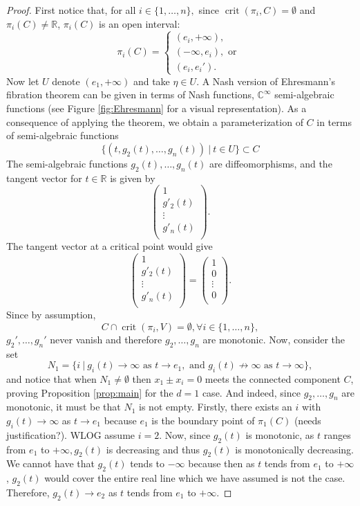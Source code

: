 \documentclass[11pt]{article}
\theoremstyle{definition}
\newcommand{\C}{\mathbb{C}}
\newcommand{\R}{\mathbb{R}}
\DeclareMathOperator{\crit}{crit}
\begin{document}
\begin{proof}
First notice that, for all $i \in \{1,\hdots,n\},$ since $\crit(\pi_i,C) = \emptyset$ and $\pi_i(C) \not = \R$, $\pi_i(C)$ is an open interval:
\[
\pi_i(C)=
\begin{cases}
			(e_i,+\infty), \\
                (-\infty,e_i),\textrm{ or }\\
                (e_i,e_i').
\end{cases}
\]
Now let $U$ denote $(e_1,+\infty)$ and take $\eta \in U.$ A Nash version of Ehresmann's fibration theorem \cite[Th. 2.4 and 3.1]{Shiota1992} can be given in terms of Nash functions, $\C^{\infty}$ semi-algebraic functions (see Figure \ref{fig:Ehresmann} for a visual representation). As a consequence of applying the theorem, we obtain a parameterization of $C$ in terms of semi-algebraic functions
\[
\big\{(t,g_2(t),\hdots,g_n(t))~|~ t \in U\big\} \subset C
\]
The semi-algebraic functions $g_2(t),\hdots,g_n(t)$ are diffeomorphisms, and the tangent vector for $t \in \R$ is given by 
\[
\begin{pmatrix}
    1 \\
    g'_2(t)\\
    \vdots\\
    g'_n(t)\\
\end{pmatrix}.
\]
The tangent vector at a critical point would give
\[
\begin{pmatrix}
    1 \\
    g'_2(t)\\
    \vdots\\
    g'_n(t)\\
\end{pmatrix}
=
\begin{pmatrix}
    1 \\
    0\\
    \vdots\\
    0\\
\end{pmatrix}.
\]
Since by assumption, 
\[
C \cap \crit(\pi_i,V) = \emptyset, \forall i \in \{1,\hdots,n\},
\]
$g_2',\hdots,g_n'$ never vanish and therefore $g_2,\hdots,g_n$ are monotonic. Now, consider the set 
\[
N_1 = \big\{i~|~g_i(t) \rightarrow \infty \textrm{ as } t \rightarrow e_1, \textrm{ and } g_i(t) \not \rightarrow \infty \textrm{ as } t \rightarrow \infty\big\},
\]
and notice that when $N_1 \not = \emptyset$ then $x_1 \pm x_i=0$ meets the connected component $C$, proving Proposition \ref{prop:main} for the $d=1$ case.  And indeed, since $g_2,\hdots,g_n$ are monotonic, it must be that $N_1$ is not empty. \color{red}Firstly, there exists an $i$ with $g_i(t) \rightarrow \infty$ as $t \rightarrow e_1$ because $e_1$ is the boundary point of $\pi_1(C)$ (needs justification?)\color{black}. WLOG assume $i=2.$ Now, since $g_2(t)$ is monotonic, as $t$ ranges from $e_1$ to $+\infty, g_2(t)$ is decreasing and thus $g_2(t)$ is monotonically decreasing. We cannot have that $g_2(t)$ tends to $-\infty$ because then as $t$ tends from $e_1$ to $+\infty$, $g_2(t)$ would cover the entire real line which we have assumed is not the case. Therefore, $g_2(t) \rightarrow e_2$ as $t$ tends from $e_1$ to $+\infty$.
\end{proof}
\end{document}
